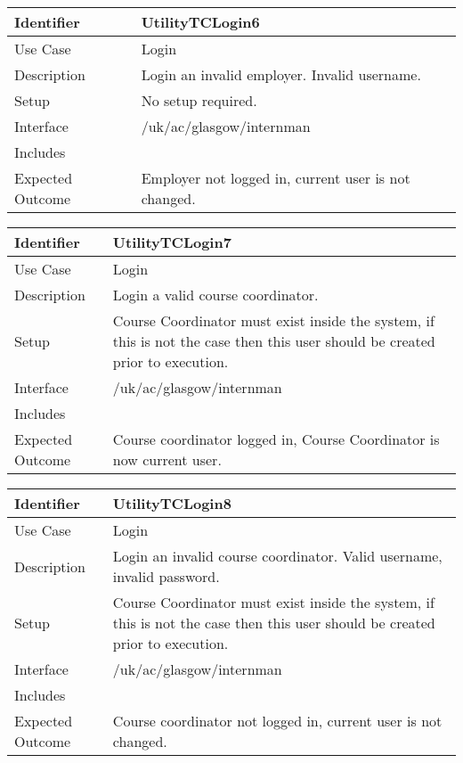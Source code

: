\vspace{2em}

\begin{tabularx}{\textwidth}{|T|L|}
\hline
Identifier & UtilityTCLogin6\\
\hline
Use Case & Login \\
\hline
Description & Login an invalid employer. Invalid username. \\
\hline
Setup & No setup required. \\
\hline
Interface & /uk/ac/glasgow/internman \\
\hline
Includes & \\
\hline
Expected Outcome & Employer not logged in, current user is not
changed.\\
\hline
\end{tabularx}

\vspace{2em}

\begin{tabularx}{\textwidth}{|T|L|}
\hline
Identifier & UtilityTCLogin7\\
\hline
Use Case & Login \\
\hline
Description & Login a valid course coordinator. \\
\hline
Setup & Course Coordinator must exist inside the system, if this is
not the case then this user should be created prior to execution. \\
\hline
Interface & /uk/ac/glasgow/internman \\
\hline
Includes & \\
\hline
Expected Outcome & Course coordinator logged in, Course
Coordinator is now current user.\\
\hline
\end{tabularx}

\vspace{2em}

\begin{tabularx}{\textwidth}{|T|L|}
\hline
Identifier & UtilityTCLogin8\\
\hline
Use Case & Login \\
\hline
Description & Login an invalid course coordinator. Valid username,
invalid password. \\
\hline
Setup & Course Coordinator must exist inside the system, if this is
not the case then this user should be created prior to execution. \\
\hline
Interface & /uk/ac/glasgow/internman \\
\hline
Includes & \\
\hline
Expected Outcome & Course coordinator not logged in, current user is
not changed. \\
\hline
\end{tabularx}


